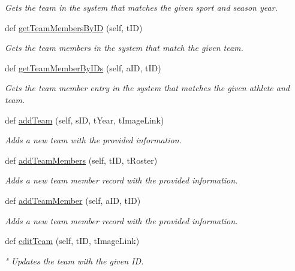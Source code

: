 \begin{DoxyCompactItemize}
\begin{DoxyCompactList}\small\item\em Gets the team in the system that matches the given sport and season year. \end{DoxyCompactList}\item 
def \hyperlink{classteam_1_1_team_handler_a566b7fb7abd1e6b1140146223af1c150}{get\+Team\+Members\+By\+ID} (self, t\+ID)
\begin{DoxyCompactList}\small\item\em Gets the team members in the system that match the given team. \end{DoxyCompactList}\item 
def \hyperlink{classteam_1_1_team_handler_a85091b1e4db82c9790eaf7f282aa526c}{get\+Team\+Member\+By\+I\+Ds} (self, a\+ID, t\+ID)
\begin{DoxyCompactList}\small\item\em Gets the team member entry in the system that matches the given athlete and team. \end{DoxyCompactList}\item 
def \hyperlink{classteam_1_1_team_handler_a6bf3721236cf70ddb4e831e9024d4ba1}{add\+Team} (self, s\+ID, t\+Year, t\+Image\+Link)
\begin{DoxyCompactList}\small\item\em Adds a new team with the provided information. \end{DoxyCompactList}\item 
def \hyperlink{classteam_1_1_team_handler_a4419dc986a6bdbaf36500820608ba8f1}{add\+Team\+Members} (self, t\+ID, t\+Roster)
\begin{DoxyCompactList}\small\item\em Adds a new team member record with the provided information. \end{DoxyCompactList}\item 
def \hyperlink{classteam_1_1_team_handler_a5fcf9bfaaf2cd44d23c7934f0cbd369e}{add\+Team\+Member} (self, a\+ID, t\+ID)
\begin{DoxyCompactList}\small\item\em Adds a new team member record with the provided information. \end{DoxyCompactList}\item 
def \hyperlink{classteam_1_1_team_handler_a1408abc9c6130b3b7187876ebcda2f5f}{edit\+Team} (self, t\+ID, t\+Image\+Link)
\begin{DoxyCompactList}\small\item\em " Updates the team with the given ID. \end{DoxyCompactList}\item 

\end{DoxyCompactItemize}

